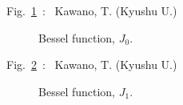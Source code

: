 \documentclass[12pt]{article}
\begin{document}
\pagestyle{empty}

%
%
\begin{flushright} Fig.~\ref{besj0}~:~ Kawano, T. (Kyushu U.) \end{flushright}
\begin{figure}[b!]
  \begin{center}
    \caption{Bessel function, $J_0$.}
    \label{besj0}
  \end{center}
\end{figure}
\clearpage

%
%
\begin{flushright} Fig.~\ref{besj1}~:~ Kawano, T. (Kyushu U.) \end{flushright}
\begin{figure}[b!]
  \begin{center}
    \caption{Bessel function, $J_1$.}
    \label{besj1}
  \end{center}
\end{figure}
\clearpage
\end{document}
